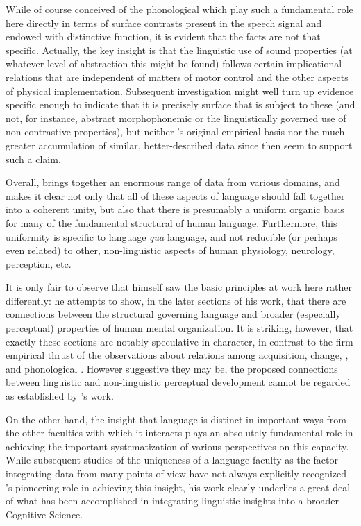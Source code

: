 While {\Jakobson} of course conceived of the phonological 
which play such a fundamental role here directly in terms of surface
contrasts present in the speech signal and endowed with distinctive
function, it is evident that the facts are not that
specific. Actually, the key insight is that the linguistic use of
sound properties (at whatever level of abstraction this might be
found) follows certain implicational relations that are independent of
matters of motor control and the other aspects of physical
implementation. Subsequent investigation might well turn up evidence
specific enough to indicate that it is precisely surface  that
is subject to these  (and not, for instance, abstract
morphophonemic  or the linguistically governed use of
non-contrastive properties), but neither {\Jakobson}'s original empirical
basis nor the much greater accumulation of similar, better-described
data since then seem to support such a claim.

Overall, {\Jakobson} brings together an enormous range of data from
various domains, and makes it clear not only that all of these aspects
of language should fall together into a coherent unity, but also that
there is presumably a uniform organic basis for many of the
fundamental structural  of human language. Furthermore,
this uniformity is specific to language \emph{qua} language, and not
reducible (or perhaps even related) to other, non-linguistic aspects of
human physiology, neurology, perception, etc.

It is only fair to observe that {\Jakobson} himself saw the basic
principles at work here rather differently: he attempts to show, in
the later sections of his work, that there are connections between the
structural  governing language and broader (especially
perceptual) properties of human mental organization. It is striking,
however, that exactly these sections are notably speculative in
character, in {contrast} to the firm empirical thrust of the
observations about relations among acquisition, change, , and
phonological . However suggestive they may be, the proposed
connections between linguistic and non-linguistic perceptual
development cannot be regarded as established by {\Jakobson}'s work.

On the other hand, the insight that language is distinct in important
ways from the other faculties with which it interacts plays an
absolutely fundamental role in achieving the important systematization
of various perspectives on this capacity. While subsequent studies of
the uniqueness of a language faculty as the factor integrating data
from many points of view have not always explicitly recognized
{\Jakobson}'s pioneering role in achieving this insight, his work clearly
underlies a great deal of what has been accomplished in integrating
linguistic insights into a broader Cognitive Science.

